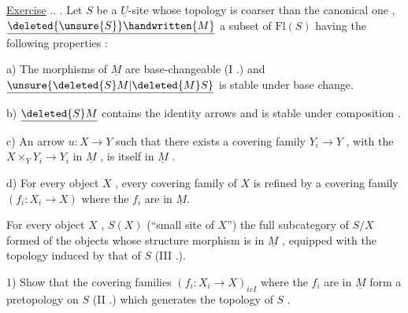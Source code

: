 \uline{Exercise} .. . Let \(S\) be a \(\underline{U}\)-site whose topology is coarser than the canonical one , \(\underline{\deleted{\unsure{S}}\handwritten{M}}\) a subset of \(\mathrm{Fl}(S)\) having the following properties :

 a) The morphisms of \(\underline{M}\) are base-changeable (I .) and \(\underline{\unsure{\deleted{S}M|\deleted{M}S}}\) is stable under base change.

 b) \(\underline{\deleted{S}M}\) contains the identity arrows and is stable under composition .

 c) An arrow \(u:X\to Y\) such that there exists a covering family \(Y_i\to Y\) , with the \(X\times_Y Y_i\to Y_i\) in \(\underline{M}\) , is itself in \(\underline{M}\) .

 d) For every object \(X\) , every covering family of \(X\) is refined by a covering family \((f_i:X_i\to X)\) where the \(f_i\) are in \(\underline{M}\).

For every object \(X\) ,  \(S(X)\) (``small site of \(X\)'')%
%
\reversemarginpar
{}
\normalmarginpar
{} the full subcategory of \(S/X\) formed of the objects whose structure morphism is in \(\underline{M}\) , equipped with the topology induced by that of \(S\) (III .).

1) Show that the covering families \((f_i:X_i\to X)_{i\varepsilon I}\) where the \(f_i\) are in \(\underline{M}\) form a pretopology on \(S\) (II .) which generates the topology of \(S\) .

